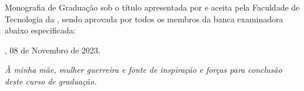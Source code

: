\documentclass[
	12pt,			%
	openright,		%
	oneside,	
	a4paper,		%
	english,		%
	brazil			%
]{abntex2/abntex2}  %
\begin{document}
\noindent


\frenchspacing

\imprimircapa

\imprimirfolhaderosto*

%
%
% 
%
\begin{folhadeaprovacao}
	\parindent=0pt
	\setlength{\ABNTEXsignskip}{1.5cm}

	Monografia de Graduação sob o título \textit{\imprimirtitulo} apresentada por {\imprimirautor} e aceita pela Faculdade de Tecnologia da {\imprimirinstituicao}, sendo aprovada por todos os membros da banca examinadora abaixo especificada:

	\vspace{1cm}
	\vspace{1cm}
	\vfill
      
	\begin{center}
		\fontsize{12}{15}\selectfont
		\vspace*{0.5cm}
		\imprimirlocal, 08 de Novembro de 2023.
		\vspace*{1cm}
	\end{center}
  
\end{folhadeaprovacao}

\begin{dedicatoria}
   \vspace*{\fill}
   \noindent
   \leftskip=7cm
   \textit{À minha mãe, mulher guerreira e fonte de inspiração e forças para conclusão deste curso de graduação.}
   \vspace{5cm}
\end{dedicatoria}
\end{document}
